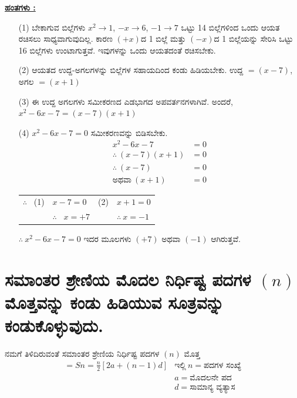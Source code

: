 \noindent
{\textbf{\underline{ಹಂತಗಳು :}}}
\begin{itemize}
\item [(1)] ಬೇಕಾಗುವ ಬಿಲ್ಲೆಗಳು $x^2 \rightarrow 1$, $-x \rightarrow 6$, $-1 \rightarrow 7$ ಒಟ್ಟು 14 ಬಿಲ್ಲೆಗಳಿಂದ ಒಂದು ಆಯತ ರಚಿಸಲು ಸಾಧ್ಯವಾಗುವುದಿಲ್ಲ. ಕಾರಣ $(+x)$ದ 1 ಬಿಲ್ಲೆ ಮತ್ತು $(-x)$ದ 1 ಬಿಲ್ಲೆಯನ್ನು ಸೇರಿಸಿ ಒಟ್ಟು 16 ಬಿಲ್ಲೆಗಳು ಉಂಟಾಗುತ್ತವೆ. ಇವುಗಳನ್ನು ಒಂದು ಆಯತದಂತೆ ರಚಿಸಬೇಕು. 
\item [(2)] ಆಯತದ ಉದ್ದ-ಅಗಲಗಳನ್ನು ಬಿಲ್ಲೆಗಳ ಸಹಾಯದಿಂದ ಕಂಡು ಹಿಡಿಯಬೇಕು. ಉದ್ದ $= (x-7)$, ಅಗಲ $= (x+1)$

\smallskip

\item [(3)] ಈ ಉದ್ದ ಅಗಲಗಳು ಸಮೀಕರಣದ ಎಡಭಾಗದ ಅಪವರ್ತನಗಳಾಗಿವೆ. ಅಂದರೆ, $x^2 - 6x - 7 = (x-7)(x+1)$
 
 \smallskip
 \item [(4)] $x^2 - 6x - 7 = 0$ ಸಮೀಕರಣವನ್ನು ಬಿಡಿಸಬೇಕು.
\begin{align*}
x^2 - 6x - 7 & = 0\\
\therefore~ (x-7)(x+1) & = 0\\
\therefore~ (x-7) & = 0\tag{1}\\
\text{ಅಥವಾ}~ (x+1) & = 0\tag{2}
\end{align*}

\begin{tabular}{llll}
$\therefore$~ (1) & $x - 7 = 0$ & (2) & $x + 1 = 0$\\
& $\therefore$~ $x = +7$ & &$\therefore~ x = -1$
\end{tabular}

\smallskip
$\therefore~ x^2 - 6x -7 = 0$ ಇದರ ಮೂಲಗಳು $(+7)$ ಅಥವಾ $(-1)$ ಆಗಿರುತ್ತವೆ. 
\end{itemize}

\section{ಸಮಾಂತರ ಶ್ರೇಣಿಯ ಮೊದಲ ನಿರ್ಧಿಷ್ಟ ಪದಗಳ $(n)$ ಮೊತ್ತವನ್ನು ಕಂಡು ಹಿಡಿಯುವ ಸೂತ್ರವನ್ನು ಕಂಡುಕೊಳ್ಳುವುದು.}\label{sec3.11}%

ನಮಗೆ ತಿಳಿದಿರುವಂತೆ ಸಮಾಂತರ ಶ್ರೇಣಿಯ ನಿರ್ಧಿಷ್ಟ ಪದಗಳ $(n)$ ಮೊತ್ತ 
\begin{align*}
= Sn = \frac{n}{2} [2a + (n-1) d] & \text{ಇಲ್ಲಿ}~ n = \text{ಪದಗಳ ಸಂಖ್ಯೆ}\\
& a = \text{ಮೊದಲನೇ ಪದ}\\
& d = \text{ಸಾಮಾನ್ಯ ವ್ಯತ್ಯಾಸ}
\end{align*}


